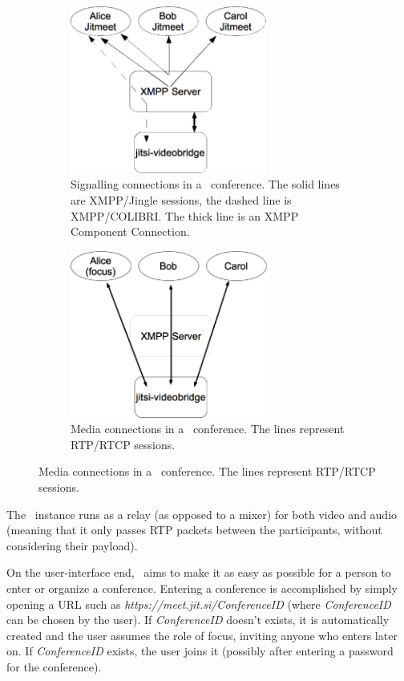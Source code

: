 \documentclass[twoside,openright,a4paper,12pt,english]{article}
\begin{document}
\begin{figure}[h]
   \centering
        \begin{subfigure}[t]{0.4\textwidth}
            \includegraphics[height=5.5cm]{./pics/jm-sig.eps}
            \caption{Signalling connections in a \jm\ conference.
                The solid lines are XMPP/Jingle sessions, the dashed line
                is XMPP/COLIBRI. The thick line is an XMPP Component Connection.}
            \label{jitmeet-sig}
        \end{subfigure}
        \quad
        \quad
        \quad
        \begin{subfigure}[t]{0.4\textwidth}
            \includegraphics[height=5.5cm]{./pics/jm-med.eps}
            \caption{Media connections in a \jm\ conference. The
                lines represent RTP/RTCP sessions.}
            \label{jitmeet-med}
        \end{subfigure}
\end{figure}

The \jvb\ instance runs as a relay (as opposed to a mixer) for both video and
audio (meaning that it only passes RTP packets between the participants,
without considering their payload).

\smallskip
On the user-interface end, \jm\ aims to make it as easy as possible for a
person to enter or organize a conference. 
Entering a conference is accomplished by simply opening a URL such as \emph{https://meet.jit.si/ConferenceID} 
(where \emph{ConferenceID} can be chosen by the user). If \emph{ConferenceID}
doesn't exists, it is automatically created and
the user assumes the role of focus, inviting anyone who enters later on. If
\emph{ConferenceID} exists,
the user joins it (possibly after entering a password for the conference).
\end{document}
